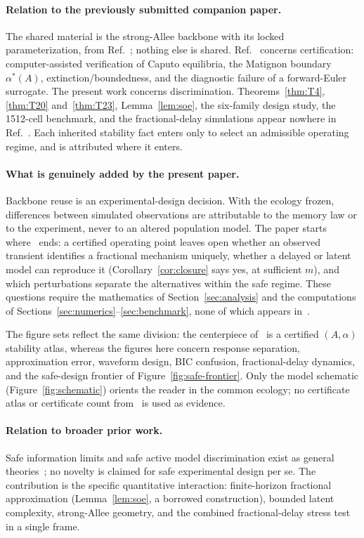 \paragraph{Relation to the previously submitted companion paper.}
The shared material is the strong-Allee backbone with its locked parameterization, from Ref.~\cite{P01}; nothing else is shared. Ref.~\cite{P01} concerns certification: computer-assisted verification of Caputo equilibria, the Matignon boundary $\alpha^*(A)$, extinction/boundedness, and the diagnostic failure of a forward-Euler surrogate. The present work concerns discrimination. Theorems~\ref{thm:T4}, \ref{thm:T20} and~\ref{thm:T23}, Lemma~\ref{lem:soe}, the six-family design study, the 1512-cell benchmark, and the fractional-delay simulations appear nowhere in Ref.~\cite{P01}. Each inherited stability fact enters only to select an admissible operating regime, and is attributed where it enters.

\paragraph{What is genuinely added by the present paper.}
Backbone reuse is an experimental-design decision. With the ecology frozen, differences between simulated observations are attributable to the memory law or to the experiment, never to an altered population model. The paper starts where~\cite{P01} ends: a certified operating point leaves open whether an observed transient identifies a fractional mechanism uniquely, whether a delayed or latent model can reproduce it (Corollary~\ref{cor:closure} says yes, at sufficient $m$), and which perturbations separate the alternatives within the safe regime. These questions require the mathematics of Section~\ref{sec:analysis} and the computations of Sections~\ref{sec:numerics}--\ref{sec:benchmark}, none of which appears in~\cite{P01}.

The figure sets reflect the same division: the centerpiece of~\cite{P01} is a certified $(A,\alpha)$ stability atlas, whereas the figures here concern response separation, approximation error, waveform design, BIC confusion, fractional-delay dynamics, and the safe-design frontier of Figure~\ref{fig:safe-frontier}. Only the model schematic (Figure~\ref{fig:schematic}) orients the reader in the common ecology; no certificate atlas or certificate count from~\cite{P01} is used as evidence.

\paragraph{Relation to broader prior work.}
Safe information limits and safe active model discrimination exist as general theories~\cite{SAFE26A,SAFE26B}; no novelty is claimed for safe experimental design per se. The contribution is the specific quantitative interaction: finite-horizon fractional approximation (Lemma~\ref{lem:soe}, a borrowed construction), bounded latent complexity, strong-Allee geometry, and the combined fractional-delay stress test in a single frame.

